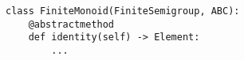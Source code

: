 \par\begin{minipage}{60ex}
\begin{verbatim}
class FiniteMonoid(FiniteSemigroup, ABC):
    @abstractmethod
    def identity(self) -> Element:
        ...
\end{verbatim}
\end{minipage}\par